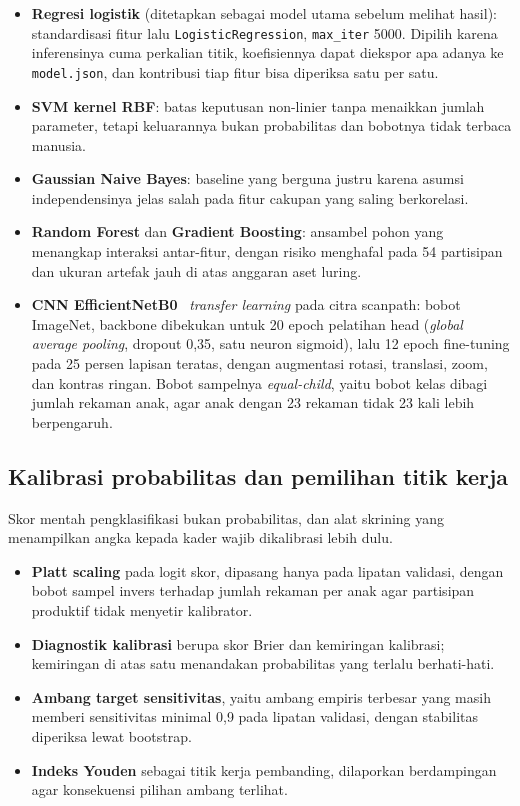 \documentclass{article}
\begin{document}
\begin{itemize}
\item \textbf{Regresi logistik} (ditetapkan sebagai model utama sebelum melihat hasil):
      standardisasi fitur lalu \texttt{LogisticRegression}, \texttt{max\_iter} 5000. Dipilih
      karena inferensinya cuma perkalian titik, koefisiennya dapat diekspor apa adanya ke
      \texttt{model.json}, dan kontribusi tiap fitur bisa diperiksa satu per satu.
\item \textbf{SVM kernel RBF}: batas keputusan non-linier tanpa menaikkan jumlah parameter,
      tetapi keluarannya bukan probabilitas dan bobotnya tidak terbaca manusia.
\item \textbf{Gaussian Naive Bayes}: baseline yang berguna justru karena asumsi
      independensinya jelas salah pada fitur cakupan yang saling berkorelasi.
\item \textbf{Random Forest} dan \textbf{Gradient Boosting}: ansambel pohon yang menangkap
      interaksi antar-fitur, dengan risiko menghafal pada 54 partisipan dan ukuran artefak
      jauh di atas anggaran aset luring.
\item \textbf{CNN EfficientNetB0}~\cite{tan2019} \emph{transfer learning} pada citra
      scanpath: bobot ImageNet, backbone dibekukan untuk 20 epoch pelatihan head
      (\emph{global average pooling}, dropout 0,35, satu neuron sigmoid), lalu 12 epoch
      fine-tuning pada 25 persen lapisan teratas, dengan augmentasi rotasi, translasi, zoom,
      dan kontras ringan. Bobot sampelnya \emph{equal-child}, yaitu bobot kelas dibagi jumlah
      rekaman anak, agar anak dengan 23 rekaman tidak 23 kali lebih berpengaruh.
\end{itemize}

\subsection*{Kalibrasi probabilitas dan pemilihan titik kerja}
\label{sec:tp-kalibrasi}

Skor mentah pengklasifikasi bukan probabilitas, dan alat skrining yang menampilkan angka
kepada kader wajib dikalibrasi lebih dulu.

\begin{itemize}
\item \textbf{Platt scaling} pada logit skor, dipasang hanya pada lipatan validasi, dengan
      bobot sampel invers terhadap jumlah rekaman per anak agar partisipan produktif tidak
      menyetir kalibrator.
\item \textbf{Diagnostik kalibrasi} berupa skor Brier dan kemiringan kalibrasi; kemiringan
      di atas satu menandakan probabilitas yang terlalu berhati-hati.
\item \textbf{Ambang target sensitivitas}, yaitu ambang empiris terbesar yang masih memberi
      sensitivitas minimal 0,9 pada lipatan validasi, dengan stabilitas diperiksa lewat
      bootstrap.
\item \textbf{Indeks Youden} sebagai titik kerja pembanding, dilaporkan berdampingan agar
      konsekuensi pilihan ambang terlihat.
\end{itemize}
\end{document}
